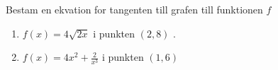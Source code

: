 










Bestam en ekvation for tangenten till grafen till funktionen $f$
\begin{enumerate}
\item $ f(x) = 4\sqrt{2x} $ i punkten $ (2,8) $ .

\item $ f(x) = 4x^2+\frac{2}{x^3} $ i punkten $ (1,6) $
\end{enumerate}